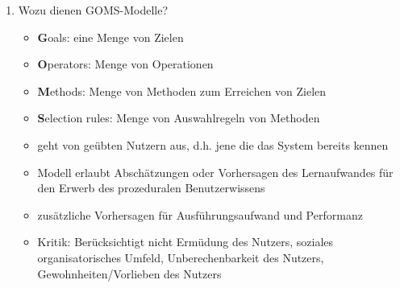 \begin{enumerate}
	\item Wozu dienen GOMS-Modelle?
	\begin{itemize}
		\item \textbf{G}oals: eine Menge von Zielen
		\item \textbf{O}perators: Menge von Operationen
		\item \textbf{M}ethods: Menge von Methoden zum Erreichen von Zielen
		\item \textbf{S}election rules: Menge von Auswahlregeln von Methoden
		\item geht von geübten Nutzern aus, d.h. jene die das System bereits kennen
		\item Modell erlaubt Abschätzungen oder Vorhersagen des Lernaufwandes für den Erwerb des prozeduralen Benutzerwissens
		\item zusätzliche Vorhersagen für Ausführungsaufwand und Performanz 
		\item Kritik: Berücksichtigt nicht Ermüdung des Nutzers, soziales organisatorisches Umfeld, Unberechenbarkeit des Nutzers, Gewohnheiten/Vorlieben des Nutzers
	\end{itemize}
\end{enumerate}